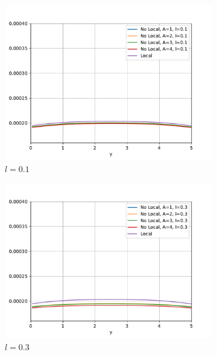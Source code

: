 		\begin{figure}
		    \centering
		    \sffamily
		    \begin{subfigure}{0.48\textwidth}
		    \centering
		        \includegraphics[width=\textwidth]{figuras/Placa/Perfiles/X/X0.1_2.519.pdf}
		        \caption{$l=0.1$}
		        \label{fig:perfilesX0259.01}
		    \end{subfigure}
		    \begin{subfigure}{0.48\textwidth}
		    \centering
		        \includegraphics[width=\textwidth]{figuras/Placa/Perfiles/X/X0.3_2.519.pdf}
		        \caption{$l=0.3$}
		        \label{fig:perfilesX0259.03}
		    \end{subfigure}
		    \quad
		    \begin{subfigure}{0.48\textwidth}

\end{subfigure}
\end{figure}
